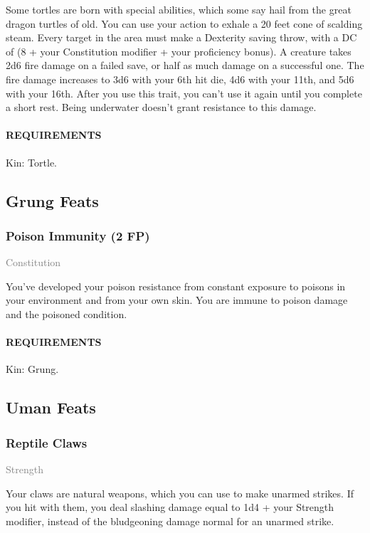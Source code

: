     \normalsize
    Some tortles are born with special abilities, which some say hail from the great dragon turtles of old.
    You can use your action to exhale a 20 feet cone of scalding steam.
    Every target in the area must make a Dexterity saving throw, with a DC of (8 + your Constitution modifier + your proficiency bonus).
    A creature takes 2d6 fire damage on a failed save, or half as much damage on a successful one.
    The fire damage increases to 3d6 with your 6th hit die, 4d6 with your 11th, and 5d6 with your 16th.
    After you use this trait, you can't use it again until you complete a short rest.
    Being underwater doesn't grant resistance to this damage.

    \paragraph{REQUIREMENTS} Kin: Tortle.

\subsection*{Grung Feats}
    \subsubsection{Poison Immunity (2 FP)} \label{feat::poisonimmunity}
    \small{\textcolor{gray}{Constitution}}

    \normalsize
    You've developed your poison resistance from constant exposure to poisons in your environment and from your own skin.
    You are immune to poison damage and the poisoned condition.
    \paragraph{REQUIREMENTS} Kin: Grung.

\subsection*{Uman Feats}
    \subsubsection{Reptile Claws} \label{feat::reptileclaws}
    \small{\textcolor{gray}{Strength}}

    \normalsize
    Your claws are natural weapons, which you can use to make unarmed strikes.
    If you hit with them, you deal slashing damage equal to 1d4 + your Strength modifier, instead of the bludgeoning damage normal for an unarmed strike.
